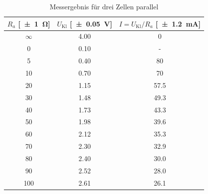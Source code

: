 \begin{table}[H]
  \centering
  \begin{tabular}{c c c} \toprule
    $R_a$ [\SI{\pm 1}{\ohm}] & $U_{\text{Kl}}$ [\SI{\pm .05}{V}] & $I=U_{\text{Kl}}/R_a$ [\SI{\pm 1.2}{mA}] \\ \midrule
    $\infty$ & \num{4.00} & 0 \\
    0 & \num{0.10} & - \\
    5 & \num{0.40} & \num{80} \\
    10 & \num{.70} & \num{70} \\
    20 & \num{1.15} & \num{57.5} \\
    30 & \num{1.48} & \num{49.3} \\
    40 & \num{1.73} & \num{43.3} \\
    50 & \num{1.98} & \num{39.6} \\
    60 & \num{2.12} & \num{35.3} \\
    70 & \num{2.30} & \num{32.9} \\
    80 & \num{2.40} & \num{30.0} \\
    90 & \num{2.52} & \num{28.0} \\
    100 & \num{2.61} & \num{26.1} \\ \bottomrule
  \end{tabular}
  \caption{Messergebnis für drei Zellen parallel}
  \label{tab:einezelle}
\end{table}


